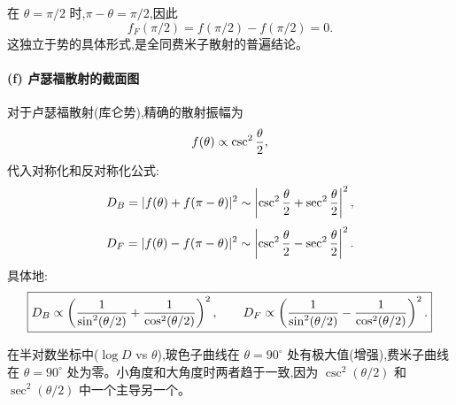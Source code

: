 \begin{solution}
在 $\theta=\pi/2$ 时,$\pi-\theta=\pi/2$,因此
\[
f_F(\pi/2)=f(\pi/2)-f(\pi/2)=0.
\]
这独立于势的具体形式,是全同费米子散射的普遍结论。

\paragraph{(f) 卢瑟福散射的截面图}

对于卢瑟福散射(库仑势),精确的散射振幅为
\[
f(\theta)\propto\csc^2{\theta\over2},
\]
代入对称化和反对称化公式:
\[
D_B=|f(\theta)+f(\pi-\theta)|^2\sim\left|\csc^2{\theta\over2}+\sec^2{\theta\over2}\right|^2,
\]
\[
D_F=|f(\theta)-f(\pi-\theta)|^2\sim\left|\csc^2{\theta\over2}-\sec^2{\theta\over2}\right|^2.
\]
具体地:
\[
\boxed{D_B\propto\left({1\over\sin^2(\theta/2)}+{1\over\cos^2(\theta/2)}\right)^2,
\qquad
D_F\propto\left({1\over\sin^2(\theta/2)}-{1\over\cos^2(\theta/2)}\right)^2.}
\]

在半对数坐标中($\log D$ vs $\theta$),玻色子曲线在 $\theta=90^\circ$ 处有极大值(增强),费米子曲线在 $\theta=90^\circ$ 处为零。小角度和大角度时两者趋于一致,因为 $\csc^2(\theta/2)$ 和 $\sec^2(\theta/2)$ 中一个主导另一个。
\end{solution}

